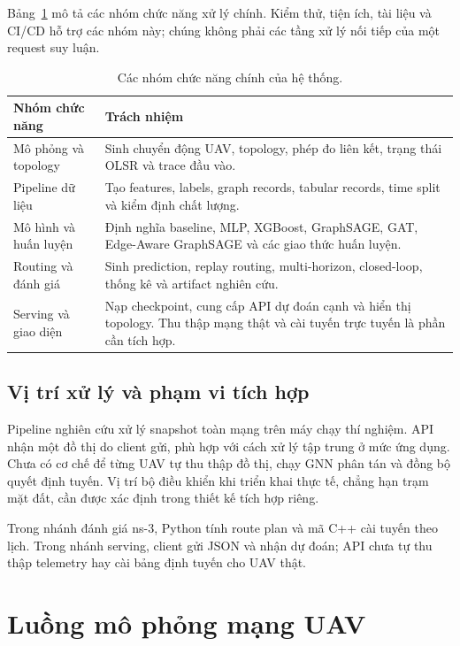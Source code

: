 \documentclass[12pt,a4paper]{article}
\begin{document}
Bảng~\ref{tab:architecture-layers} mô tả các nhóm chức năng xử lý chính. Kiểm thử, tiện ích, tài liệu và CI/CD hỗ trợ các nhóm này; chúng không phải các tầng xử lý nối tiếp của một request suy luận.

\begin{table}[htbp]
  \centering
  \caption{Các nhóm chức năng chính của hệ thống.}
  \label{tab:architecture-layers}
  \begin{tabularx}{\textwidth}{@{}p{}X@{}}
    \toprule
    \textbf{Nhóm chức năng} & \textbf{Trách nhiệm} \\
    \midrule
    Mô phỏng và topology & Sinh chuyển động UAV, topology, phép đo liên kết, trạng thái OLSR và trace đầu vào. \\
    Pipeline dữ liệu & Tạo features, labels, graph records, tabular records, time split và kiểm định chất lượng. \\
    Mô hình và huấn luyện & Định nghĩa baseline, MLP, XGBoost, GraphSAGE, GAT, Edge-Aware GraphSAGE và các giao thức huấn luyện. \\
    Routing và đánh giá & Sinh prediction, replay routing, multi-horizon, closed-loop, thống kê và artifact nghiên cứu. \\
    Serving và giao diện & Nạp checkpoint, cung cấp API dự đoán cạnh và hiển thị topology. Thu thập mạng thật và cài tuyến trực tuyến là phần cần tích hợp. \\
    \bottomrule
  \end{tabularx}
\end{table}
\FloatBarrier

\subsection{Vị trí xử lý và phạm vi tích hợp}

Pipeline nghiên cứu xử lý snapshot toàn mạng trên máy chạy thí nghiệm. API nhận một đồ thị do client gửi, phù hợp với cách xử lý tập trung ở mức ứng dụng. Chưa có cơ chế để từng UAV tự thu thập đồ thị, chạy GNN phân tán và đồng bộ quyết định tuyến. Vị trí bộ điều khiển khi triển khai thực tế, chẳng hạn trạm mặt đất, cần được xác định trong thiết kế tích hợp riêng.

Trong nhánh đánh giá ns-3, Python tính route plan và mã C++ cài tuyến theo lịch. Trong nhánh serving, client gửi JSON và nhận dự đoán; API chưa tự thu thập telemetry hay cài bảng định tuyến cho UAV thật.

\section{Luồng mô phỏng mạng UAV}
\label{sec:simulation}
\end{document}
